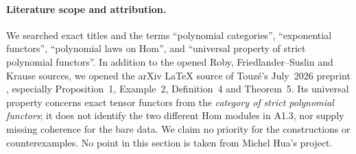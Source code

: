 \paragraph{Literature scope and attribution.}
We searched exact titles and the terms ``polynomial categories'',
``exponential functors'', ``polynomial laws on Hom'', and ``universal
property of strict polynomial functors''. In addition to the opened
Roby, Friedlander--Suslin and Krause sources, we opened the arXiv
LaTeX source of Touz\'e's July~2026 preprint \cite{Touze2026},
especially Proposition~1, Example~2, Definition~4 and
Theorem~5. Its universal property concerns exact tensor functors from
the \emph{category of strict polynomial functors}; it does not identify
the two different Hom modules in A1.3, nor supply missing coherence
for the bare data. We claim no priority for the constructions or
counterexamples. No point in this section is taken from Michel Hua's
project.
